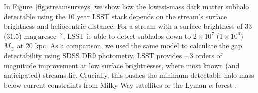 \documentclass[modern,linenumbers]{aastex62}
\begin{document}

In Figure~\ref{fig:streamsurveys} we show how the lowest-mass dark matter subhalo detectable using the 10 year LSST stack depends on the stream's surface brightness and heliocentric distance. For a stream with a surface brightness of 33 (31.5) $\mathrm{mag}\,\mathrm{arcsec}^{-2}$, LSST is able to detect subhalos down to $2 \times 10^7$ ($1 \times10^6$) $M_\odot$ at 20 kpc. As a comparison, we used the same model to calculate the gap detectability using SDSS DR9 photometry. LSST provides $\sim 3$ orders of magnitude improvement at low surface brightnesses, where most known (and anticipated) streams lie. Crucially, this pushes the minimum detectable halo mass below current constraints from Milky Way satellites \citep[\eg,][]{Jethwa:2018,Kim:2017iwr} or the Lyman $\alpha$ forest \citep[\eg,][]{2017PhRvD..96b3522I}.
\end{document}
